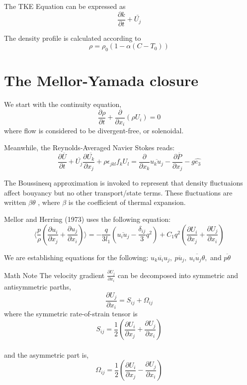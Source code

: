 \documentclass[
  letterpaper,
  DIV=11,
  numbers=noendperiod]{scrartcl}
\begin{document}
The TKE Equation can be expressed as \begin{equation}
\frac{\partial k}{\partial t} + \bar{U_j}
\end{equation}

The density profile is calculated according to \begin{equation}
\rho = \rho_0 (1 - \alpha (C - T_0))
\end{equation}

\section{The Mellor-Yamada closure}

We start with the continuity equation, \begin{equation}
\frac{\partial \rho}{\partial t} + \frac{\partial }{\partial x_i} (\rho U_i) = 0 
\end{equation} where flow is considered to be divergent-free, or
solenoidal.

Meanwhile, the Reynolds-Averaged Navier Stokes reads: \begin{equation}
\frac{\partial \overline{U}}{\partial t} 
+ \overline{U_j} \frac{\partial \overline{U_k} }{\partial x_j} 
+ \rho \epsilon_{jkl} f_k U_l 
= \frac{\partial }{\partial x_k} \overline{u_k u_j} 
- \frac{\partial \overline{P}}{\partial x_j} 
- g \hat{e_3} 
\end{equation}

The Boussinesq approximation is invoked to represent that density
fluctuaions affect bouyancy but no other transport/state terms. These
fluctuations are written \(\beta \theta\) , where \(\beta\) is the
coefficient of thermal expansion.

Mellor and Herring (1973) uses the following equation: \begin{equation}
\langle \frac{p}{\rho} (\frac{\partial u_i}{\partial x_j} + \frac{\partial u_j}{\partial x_i})  \rangle = - \frac{q}{3l_1} ( \overline{u_iu_j} - \frac{\delta_{ij}}{3} q^2) + C_1 q^2 (\frac{\partial U_i}{\partial x_j} + \frac{\partial U_j}{\partial x_i})  
\end{equation}

We are establishing equations for the following:
\(\overline{u_k u_i u_j},~ \overline{p u_j},~ \overline{u_i u_j \theta},\)
and \(\overline{p\theta}\)

Math Note The velocity gradient \(\frac{\partial U_j}{\partial x_i}\)
can be decomposed into symmetric and antisymmetric parths,
\[\frac{\partial U_j}{\partial x_i} = S_{ij} + \Omega_{ij} \] where the
symmetric rate-of-strain tensor is
\[ S_{ij} = \frac{1}{2} \left( \frac{\partial U_i}{\partial x_j} + \frac{\partial U_j}{\partial x_i} \right) \]\\
and the asymmetric part is,
\[ \Omega_{ij} = \frac{1}{2} \left( \frac{\partial U_i}{\partial x_j} - \frac{\partial U_j}{\partial x_i} \right) \]
\end{document}
